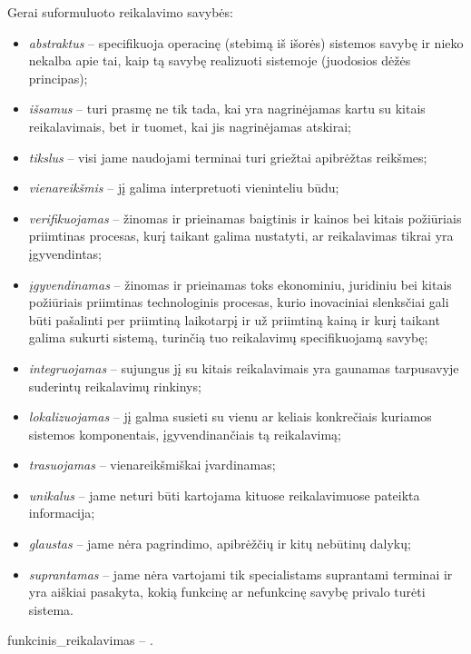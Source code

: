 Gerai suformuluoto reikalavimo savybės:
\begin{itemize}
  \item \emph{abstraktus} – specifikuoja operacinę (stebimą iš išorės)
    sistemos savybę ir nieko nekalba apie tai, kaip tą savybę realizuoti
    sistemoje (juodosios dėžės principas);
  \item \emph{išsamus} – turi prasmę ne tik tada, kai yra nagrinėjamas
    kartu su kitais reikalavimais, bet ir tuomet, kai jis nagrinėjamas
    atskirai;
  \item \emph{tikslus} – visi jame naudojami terminai turi griežtai
    apibrėžtas reikšmes;
  \item \emph{vienareikšmis} – jį galima interpretuoti vieninteliu būdu;
  \item \emph{verifikuojamas} – žinomas ir prieinamas baigtinis ir kainos
    bei kitais požiūriais priimtinas procesas, kurį taikant galima
    nustatyti, ar reikalavimas tikrai yra įgyvendintas;
  \item \emph{įgyvendinamas} – žinomas ir prieinamas toks ekonominiu,
    juridiniu bei kitais požiūriais priimtinas technologinis procesas,
    kurio inovaciniai slenksčiai gali būti pašalinti per priimtiną
    laikotarpį ir už priimtiną kainą ir kurį taikant galima sukurti
    sistemą, turinčią tuo reikalavimų specifikuojamą savybę;
  \item \emph{integruojamas} – sujungus jį su kitais reikalavimais yra
    gaunamas tarpusavyje suderintų reikalavimų rinkinys;
  \item \emph{lokalizuojamas} – jį galma susieti su vienu ar keliais
    konkrečiais kuriamos sistemos komponentais, įgyvendinančiais tą
    reikalavimą;
  \item \emph{trasuojamas} – vienareikšmiškai įvardinamas;
  \item \emph{unikalus} – jame neturi būti kartojama kituose reikalavimuose
    pateikta informacija;
  \item \emph{glaustas} – jame nėra pagrindimo, apibrėžčių ir kitų
    nebūtinų dalykų;
  \item \emph{suprantamas} – jame nėra vartojami tik specialistams 
    suprantami terminai ir yra aiškiai pasakyta, kokią funkcinę ar 
    nefunkcinę savybę privalo turėti sistema.
\end{itemize}


\Gls{funkcinis_reikalavimas} – .

